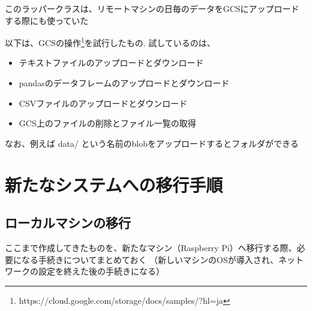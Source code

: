 \documentclass[12pt,a4paper,uplatex]{jsbook}
\begin{document}


このラッパークラスは、リモートマシンの日毎のデータをGCSにアップロードする際にも使っていた

以下は、GCSの操作\footnote{https://cloud.google.com/storage/docs/samples/?hl=ja}を試行したもの. 試しているのは、
\begin{itemize}
	\item テキストファイルのアップロードとダウンロード
	\item pandasのデータフレームのアップロードとダウンロード
	\item CSVファイルのアップロードとダウンロード
	\item GCS上のファイルの削除とファイル一覧の取得
\end{itemize}
なお、例えば data/ という名前のblobをアップロードするとフォルダができる

\newpage



\section{新たなシステムへの移行手順}

\subsection{ローカルマシンの移行}

ここまで作成してきたものを、新たなマシン（Raspberry Pi）へ移行する際、必要になる手続きについてまとめておく
（新しいマシンのOSが導入され、ネットワークの設定を終えた後の手続きになる）
\end{document}
